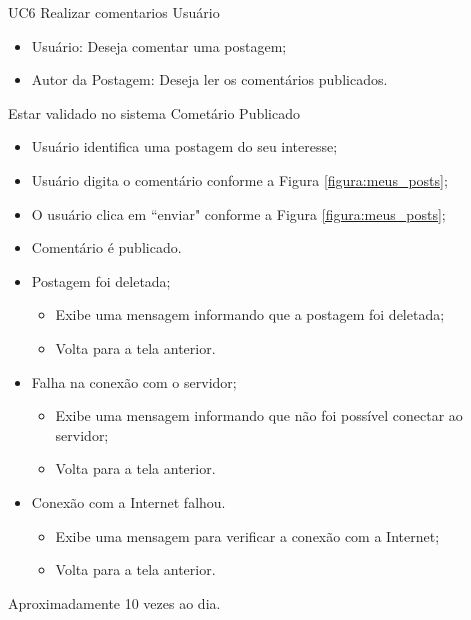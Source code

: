 \casoDeUso
{UC6}
{Realizar comentarios}
{Usuário}
{
\begin{itemize}
	\item Usuário: Deseja comentar uma postagem;
	\item Autor da Postagem: Deseja ler os comentários publicados.
\end{itemize}

}
{Estar validado no sistema}
{Cometário Publicado}
{
\begin{itemize}
	\item Usuário identifica uma postagem do seu interesse;
	\item Usuário digita o comentário conforme a Figura \ref{figura:meus_posts};
	\item O usuário clica em ``enviar" conforme a Figura \ref{figura:meus_posts};
	\item Comentário é publicado.
\end{itemize}
}
{
\begin{itemize}
	\item Postagem foi deletada;
	\begin{itemize}
		\item Exibe uma mensagem informando que a postagem foi deletada;
		\item Volta para a tela anterior.
	\end{itemize}
	
	\item Falha na conexão com o servidor;
	
	\begin{itemize}
		\item Exibe uma mensagem informando que não foi possível conectar ao servidor;
		\item Volta para a tela anterior.
	\end{itemize}
	
	\item Conexão com a Internet falhou.
	\begin{itemize}
		\item Exibe uma mensagem para verificar a conexão com a Internet;
		\item Volta para a tela anterior.
	\end{itemize}

	
	
\end{itemize}
}
{Aproximadamente 10 vezes ao dia.}
{

}

